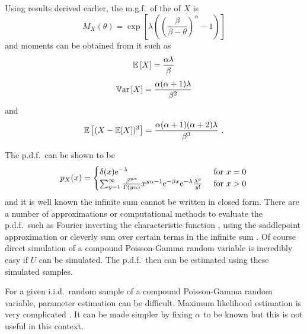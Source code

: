 Using results derived earlier, the m.g.f.~of the of $X$ is
\begin{equation}
	M_X(\theta)=\exp\left[\lambda\left(\left(\frac{\beta}{\beta-\theta}\right)^{\alpha}-1\right)\right]
\end{equation}
and moments can be obtained from it such as
\begin{equation}
	\operatorname{\mathbb{E}}\left[X\right]=\frac{\alpha\lambda}{\beta}
\end{equation}
\begin{equation}
	\operatorname{\mathbb{V}ar}\left[X\right]=\frac{\alpha(\alpha+1)\lambda}{\beta^2}
	\label{eq:compoundPoisson_variance}
\end{equation}
and
\begin{equation}
	\operatorname{\mathbb{E}}\left[(X-\operatorname{\mathbb{E}}[X])^3\right] = \frac{\alpha(\alpha+1)(\alpha+2)\lambda}{\beta^3}
	\ .
\end{equation}

The p.d.f.~can be shown to be
\begin{equation}
	p_X(x) = 
	\begin{cases}
		\delta(x) \mathrm{e}^{-\lambda} & \text{ for } x=0 \\ 
		\sum_{y=1}^{\infty}\frac{\beta^{y\alpha}}{\Gamma(y\alpha)}x^{y\alpha-1}\mathrm{e}^{-\beta x}\mathrm{e}^{-\lambda}\frac{\lambda^y}{y!} & \text{ for } x>0
	\end{cases}
	\label{eq:compoundPoisson_pdf}
\end{equation}
and it is well known the infinite sum cannot be written in closed form. There are a number of approximations or computational methods to evaluate the p.d.f.~such as Fourier inverting the characteristic function \citep{dunn2008evaluation}, using the saddlepoint approximation \citep{daniels1954saddlepoint} or cleverly sum over certain terms in the infinite sum \citep{dunn2005series}. Of course direct simulation of a compound Poisson-Gamma random variable is incredibly easy if $U$ can be simulated. The p.d.f.~then can be estimated using these simulated samples.

For a given i.i.d.~random sample of a compound Poisson-Gamma random variable, parameter estimation can be difficult. Maximum likelihood estimation is very complicated \citep{withers2011compound}. It can be made simpler by fixing $\alpha$ to be known \citep{withers2011compound} but this is not useful in this context.

